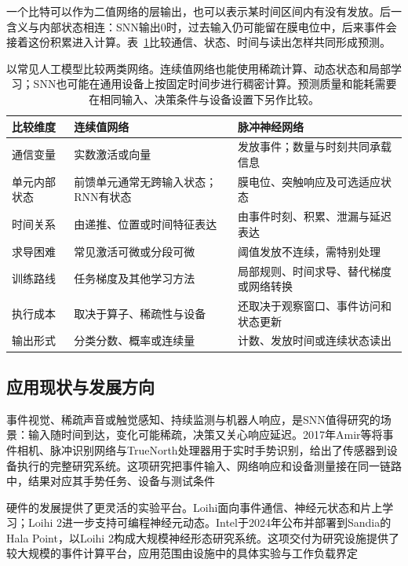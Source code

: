 一个比特可以作为二值网络的层输出，也可以表示某时间区间内有没有发放。后一含义与内部状态相连：SNN输出0时，过去输入仍可能留在膜电位中，后来事件会接着这份积累进入计算。表~\ref{tab:snn-ann-comparison}比较通信、状态、时间与读出怎样共同形成预测。
\begin{table}[htbp]
  \centering\small
  \begin{tabularx}{\linewidth}{@{}p{25mm}XX@{}}
    \toprule
    比较维度 & 连续值网络 & 脉冲神经网络 \\
    \midrule
    通信变量 & 实数激活或向量 & 发放事件；数量与时刻共同承载信息 \\
    单元内部状态 & 前馈单元通常无跨输入状态；RNN有状态 & 膜电位、突触响应及可选适应状态 \\
    时间关系 & 由递推、位置或时间特征表达 & 由事件时刻、积累、泄漏与延迟表达 \\
    求导困难 & 常见激活可微或分段可微 & 阈值发放不连续，需特别处理 \\
    训练路线 & 任务梯度及其他学习方法 & 局部规则、时间求导、替代梯度或网络转换 \\
    执行成本 & 取决于算子、稀疏性与设备 & 还取决于观察窗口、事件访问和状态更新 \\
    输出形式 & 分类分数、概率或连续量 & 计数、发放时间或连续状态读出 \\
    \bottomrule
  \end{tabularx}
  \caption{以常见人工模型比较两类网络。连续值网络也能使用稀疏计算、动态状态和局部学习；SNN也可能在通用设备上按固定时间步进行稠密计算。预测质量和能耗需要在相同输入、决策条件与设备设置下另作比较。}
  \label{tab:snn-ann-comparison}
\end{table}
\FloatBarrier

\subsection{应用现状与发展方向}
\label{sec:snn-development}

事件视觉、稀疏声音或触觉感知、持续监测与机器人响应，是SNN值得研究的场景：输入随时间到达，变化可能稀疏，决策又关心响应延迟。2017年Amir等将事件相机、脉冲识别网络与TrueNorth处理器用于实时手势识别，给出了传感器到设备执行的完整研究系统。这项研究把事件输入、网络响应和设备测量接在同一链路中，结果对应其手势任务、设备与测试条件

硬件的发展提供了更灵活的实验平台。Loihi面向事件通信、神经元状态和片上学习；Loihi 2进一步支持可编程神经元动态。Intel于2024年公布并部署到Sandia的Hala Point，以Loihi 2构成大规模神经形态研究系统。这项交付为研究设施提供了较大规模的事件计算平台，应用范围由设施中的具体实验与工作负载界定

